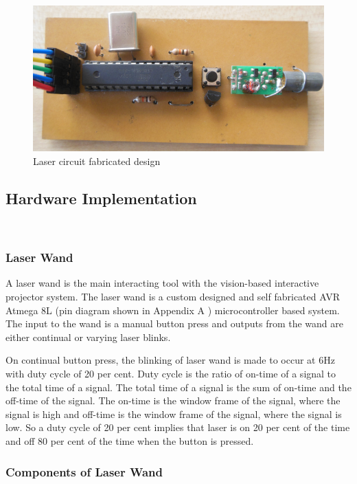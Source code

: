 \documentclass[12pt, a4paper]{article}
\begin{document}
\begin{figure}[htp]
	\centering
	\includegraphics[scale=0.2]{front.png}
	\caption{Laser circuit fabricated design}
	\label{}
\end{figure}

\subsection{Hardware Implementation}
~\\
\subsubsection{Laser Wand}

A laser wand is the main interacting tool with the vision-based interactive projector system. The laser wand is a custom designed and self fabricated AVR Atmega 8L (pin diagram shown in Appendix A ) microcontroller based system. The input to the wand is a manual button press and outputs from the wand are either continual or varying laser blinks. 

On continual button press, the blinking of laser wand is made to occur at 6Hz with duty cycle of 20 per cent. Duty cycle is the ratio of on-time of a signal to the total time of a signal. The total time of a signal is the sum of on-time and the off-time of the signal. The on-time is the window frame of the signal, where the signal is high and off-time is the window frame of the signal, where the signal is low. So a duty cycle of 20 per cent implies that laser is on 20 per cent of the time and off 80 per cent of the time when the button is pressed. 

\subsubsection{Components of Laser Wand}
\end{document}
